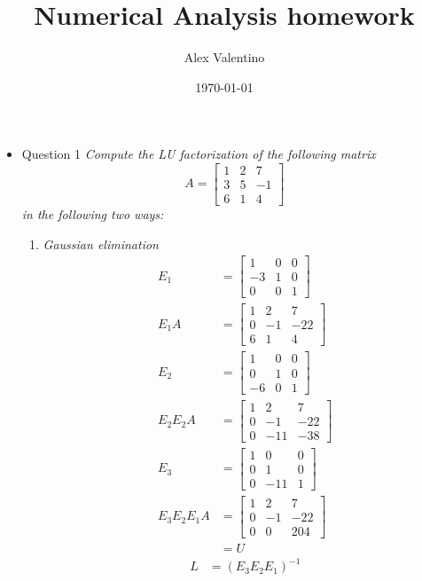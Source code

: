 \documentclass[12pt, letterpaper]{article}
\date{\today}
\author{Alex Valentino}
\title{Numerical Analysis homework}
\begin{document}
\begin{itemize}
	\item{Question 1} \textit{Compute the LU factorization of the following matrix
	$$
	A = \begin{bmatrix}
		1 & 2 & 7\\
		3 & 5 & -1\\
		6 & 1 & 4
	\end{bmatrix}	
	$$	in the following two ways:
	}
	\begin{enumerate}
		\item \textit{Gaussian elimination}
		\begin{align*}
			E_1 &= \begin{bmatrix}
			1 & 0 & 0\\
			-3 & 1 & 0\\
			0 & 0 & 1
			\end{bmatrix}\\
			E_1A &= \begin{bmatrix}
			1 & 2 & 7\\
			0 & -1 & -22\\
			6 & 1 & 4
			\end{bmatrix}\\
			E_2 &= \begin{bmatrix}
			1 & 0 & 0\\
			0 & 1 & 0\\
			-6 & 0 & 1
			\end{bmatrix}\\
			E_2E_2A &= \begin{bmatrix}
				1 & 2 & 7\\
				0 & -1 & -22\\
				0 & -11 & -38
			\end{bmatrix}\\
			E_3 &= \begin{bmatrix}
				1 & 0 &0\\
				0 & 1 & 0\\
				0 & -11 & 1 
			\end{bmatrix}\\
			E_3 E_2 E_1 A &= \begin{bmatrix}
			1 & 2 & 7\\
			0 & -1 & -22\\
			0 & 0 & 204
			\end{bmatrix}\\
			&= U
		\end{align*}
		\begin{align*}
		L &= (E_3 E_2 E_1)^{-1}\\

\end{align*}
\end{enumerate}
\end{itemize}
\end{document}
